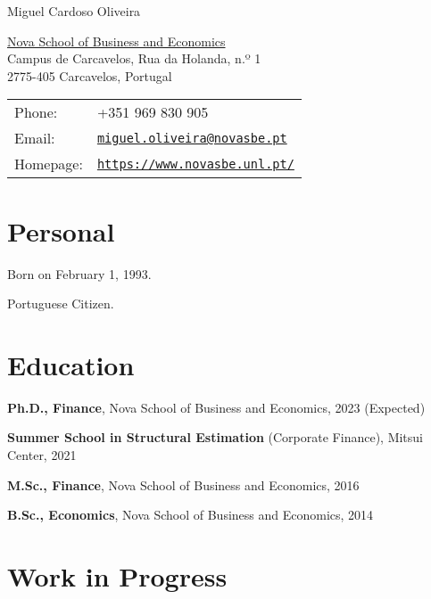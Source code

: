 \documentclass[letterpaper]{article}
\def\name{Miguel Cardoso Oliveira}
\renewenvironment{itemize}{
  \begin{list}{}{
    \setlength{\leftmargin}{1.5em}
  }
}{
  \end{list}
}
\begin{document}
{\huge \name}

\vspace{0.25in}

\begin{minipage}{0.45\linewidth}
  \href{https://www.novasbe.unl.pt/en/}{Nova School of Business and Economics} \\
  Campus de Carcavelos, Rua da Holanda, n.º 1 \\ 
  2775-405 Carcavelos, Portugal \\
\end{minipage}
\begin{minipage}{0.45\linewidth}
  \begin{tabular}{ll}
    Phone: & +351 969 830 905 \\
    Email: & \href{mailto:miguel.oliveira@novasbe.pt}{\tt miguel.oliveira@novasbe.pt} \\
    Homepage: & \href{https://www.novasbe.unl.pt/}{\tt https://www.novasbe.unl.pt/} \\
  \end{tabular}
\end{minipage}


\section*{Personal}

\begin{itemize}
\item Born on February 1, 1993.
\item Portuguese Citizen.
\end{itemize}


\section*{Education}

\begin{itemize}
  \item \textbf{Ph.D., Finance}, Nova School of Business and Economics, 2023 (Expected)
  \item \textbf{Summer School in Structural Estimation} (Corporate Finance), Mitsui Center, 2021
  \item \textbf{M.Sc., Finance}, Nova School of Business and Economics, 2016
  \item \textbf{B.Sc., Economics}, Nova School of Business and Economics, 2014
\end{itemize}

\section*{Work in Progress}
\end{document}
